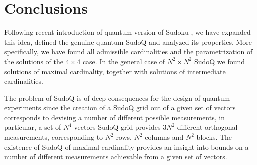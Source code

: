 \documentclass[aps,onecolumn,floatfix,superscriptaddress]{revtex4}
\begin{document}
\section{Conclusions}
Following recent introduction of quantum version of Sudoku \cite{Nechita2020SudoQA}, we have expanded this idea, defined the genuine quantum SudoQ and analyzed its properties. More specifically, we have found all admissible cardinalities and the parametrization of the solutions of the $4\times 4$ case.
In the general case of $N^2 \times N^2$ SudoQ we found solutions of maximal cardinality, together with solutions of intermediate cardinalities.

The problem of SudoQ is of deep consequences for the design of quantum experiments since the creation of a SudoQ grid out of a given set of vectors corresponds to devising a number of different possible measurements, in particular, a set of $N^4$ vectors SudoQ grid provides $3N^2$ different orthogonal measurements, corresponding to $N^2$ rows, $N^2$ columns and $N^2$ blocks. 
The existence of SudoQ of maximal cardinality provides an insight into bounds on a number of different measurements achievable from a given set of vectors.



\printbibliography
\end{document}

